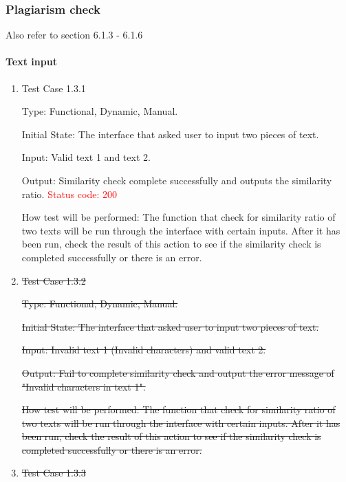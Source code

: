 \documentclass[12pt, titlepage]{article}
\begin{document}
\subsubsection{Plagiarism check}
Also refer to section 6.1.3 - 6.1.6

\paragraph{Text input}

\begin{enumerate}

\item{Test Case 1.3.1\\}

Type: Functional, Dynamic, Manual.
					
Initial State: The interface that asked user to input two pieces of text.
					
Input: Valid text 1 and text 2.
					
Output: Similarity check complete successfully and outputs the similarity ratio. \textcolor{red}{Status code: 200}
					
How test will be performed: The function that check for similarity ratio of two texts will be run through the interface with certain inputs. After it has been run, check the result of this action to see if the similarity check is completed successfully or there is an error.

\item{ \st{ Test Case 1.3.2} \\}

\st{Type: Functional, Dynamic, Manual.}
					
\st{Initial State: The interface that asked user to input two pieces of text.}
					
\st{Input: Invalid text 1 (Invalid characters) and valid text 2.}
					
\st{Output: Fail to complete similarity check and output the error message of "Invalid characters in text 1".}
					
\st{How test will be performed: The function that check for similarity ratio of two texts will be run through the interface with certain inputs. After it has been run, check the result of this action to see if the similarity check is completed successfully or there is an error.}

\item{\st{ Test Case 1.3.3}\\}


\end{enumerate}
\end{document}
